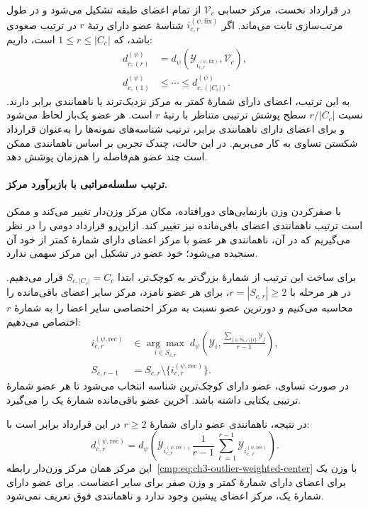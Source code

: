 در قرارداد نخست، مرکز حسابی $\mathcal V_c$ از
تمام اعضای طبقه تشکیل می‌شود و در طول مرتب‌سازی
ثابت می‌ماند. اگر $i_{c,r}^{(\psi,\mathrm{fix})}$
شناسهٔ عضو دارای رتبهٔ $r$ در ترتیب صعودی باشد،
که $1\le r\le |C_c|$ است،
داریم:
\begin{equation}\label{cmp:eq:ch3-quantile-order}
\begin{aligned}
d_{c,(r)}^{(\psi)}
&=d_\psi(\mathscr Y_{i_{c,r}^{(\psi,\mathrm{fix})}},
\mathcal V_c),\\
d_{c,(1)}^{(\psi)}&\le\cdots\le
d_{c,(|C_c|)}^{(\psi)}.
\end{aligned}
\end{equation}
به این ترتیب، اعضای دارای شمارهٔ کمتر به مرکز
نزدیک‌ترند یا ناهمانندی برابر دارند. نسبت
$r/|C_c|$ سطح پوشش ترتیبی متناظر با رتبهٔ $r$
است. هر عضو یک‌بار لحاظ می‌شود و برای اعضای
دارای ناهمانندی برابر، ترتیب شناسه‌های نمونه‌ها
را به‌عنوان قرارداد شکستن تساوی به کار می‌بریم.
در این حالت، چندک تجربی بر اساس ناهمانندی ممکن
است چند عضو هم‌فاصله را هم‌زمان پوشش دهد.

\paragraph{ترتیب سلسله‌مراتبی با بازبرآورد مرکز.}
با صفرکردن وزن بازنمایی‌های دورافتاده، مکان مرکز
وزن‌دار تغییر می‌کند و ممکن است ترتیب ناهمانندی
اعضای باقی‌مانده نیز تغییر کند. ازاین‌رو قرارداد
دومی را در نظر می‌گیریم که در آن، ناهمانندی هر
عضو با مرکز اعضای دارای شمارهٔ کمتر از خود آن
سنجیده می‌شود؛ خود عضو در تشکیل این مرکز سهمی
ندارد.

برای ساخت این ترتیب از شمارهٔ بزرگ‌تر به کوچک‌تر،
ابتدا $S_{c,|C_c|}=C_c$ قرار می‌دهیم. در هر مرحله
با $r=|S_{c,r}|\ge2$، برای هر عضو نامزد، مرکز
سایر اعضای باقی‌مانده را محاسبه می‌کنیم و
دورترین عضو نسبت به مرکز اختصاصی سایر اعضا
را به شمارهٔ $r$ اختصاص می‌دهیم:
\begin{equation}\label{cmp:eq:ch3-recursive-order}
\begin{aligned}
i_{c,r}^{(\psi,\mathrm{rec})}
&\in\underset{i\in S_{c,r}}{\arg\max}\;
d_\psi\left(\mathscr Y_i,
\frac{\sum_{j\in S_{c,r}\setminus\{i\}}\mathscr Y_j}{r-1}\right),\\
S_{c,r-1}
&=S_{c,r}\setminus\{i_{c,r}^{(\psi,\mathrm{rec})}\}.
\end{aligned}
\end{equation}
در صورت تساوی، عضو دارای کوچک‌ترین شناسه انتخاب
می‌شود تا هر عضو شمارهٔ ترتیبی یکتایی داشته باشد.
آخرین عضو باقی‌مانده شمارهٔ یک را می‌گیرد.

در نتیجه، ناهمانندی عضو دارای شمارهٔ $r\ge2$
در این قرارداد برابر است با:
\begin{equation}\label{cmp:eq:ch3-recursive-order-distance}
d_{c,r}^{(\psi,\mathrm{rec})}
=d_\psi\left(
\mathscr Y_{i_{c,r}^{(\psi,\mathrm{rec})}},
\frac{1}{r-1}\sum_{\ell=1}^{r-1}
\mathscr Y_{i_{c,\ell}^{(\psi,\mathrm{rec})}}
\right).
\end{equation}
این مرکز همان مرکز وزن‌دار
رابطه~\eqref{cmp:eq:ch3-outlier-weighted-center}
با وزن یک برای اعضای دارای شمارهٔ کمتر و وزن
صفر برای سایر اعضاست. برای عضو دارای شمارهٔ یک،
مرکز اعضای پیشین وجود ندارد و ناهمانندی فوق
تعریف نمی‌شود.

